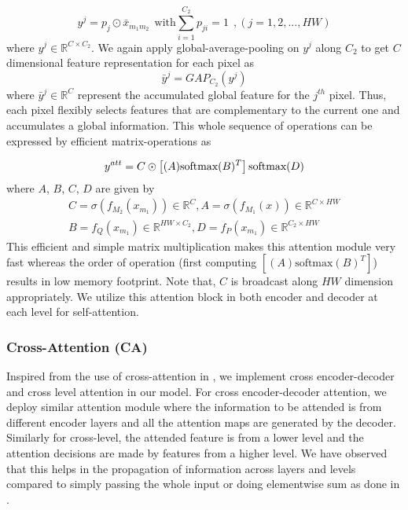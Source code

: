\documentclass[10pt,twocolumn,letterpaper]{article}
\begin{document}
\begin{equation}
y^j = p_j \odot \bar{x}_{{m_1}{m_2}} ~ ~ \text{with}  \sum_{i=1}^{C_2} p_{ji} = 1 ~ ~ , (j= 1,2,...,HW)
\end{equation}
where ${y}^j \in \mathbb{R}^{C \times C_2}$. We again apply global-average-pooling on ${y}^j$ along $C_2$ to get $C$ dimensional feature representation for each pixel as
\begin{equation}
    \bar{y}^{j} = GAP_{C_2}({y}^j)
\end{equation}
where $\bar{y}^{j} \in \mathbb{R}^C$ represent the accumulated global feature for the $j^{th}$ pixel. Thus, each pixel flexibly selects features that are complementary to the current one and accumulates a global information.
This whole sequence of operations can be expressed by efficient matrix-operations as



\begin{equation}
    y^{att} =  C\odot \left[(A)\text{softmax}(B)^T\right]\text{softmax}(D) \\ 
\end{equation} 
where $A$, $B$, $C$, $D$ are given by
\begin{gather*}
    C = \sigma (f_{M_2}(x_{m_1})) \in  \mathbb{R}^{C}  , A = \sigma(f_{M_1}(x)) \in  \mathbb{R}^{C \times HW} \\ 
    B = f_Q(x_{m_1}) \in  \mathbb{R}^{HW \times C_2}, D = f_P(x_{m_1}) \in  \mathbb{R}^{C_2 \times HW}
\end{gather*}
This efficient and simple matrix multiplication makes this attention module very fast whereas the order of operation (first computing $[(A)\text{softmax}(B)^T]$) results in low memory footprint. Note that, $C$ is broadcast along $HW$ dimension appropriately. We utilize this attention block in both encoder and decoder at each level for self-attention.
\subsubsection{Cross-Attention (CA)}
Inspired from the use of cross-attention in \cite{vaswani2017attention}, we implement cross encoder-decoder and cross level attention in our model. For cross encoder-decoder attention, we deploy similar attention module where the information to be attended is from different encoder layers and all the attention maps are generated by the decoder. Similarly for cross-level, the attended feature is from a lower level and the attention decisions are made by features from a higher level. We have observed that this helps in the propagation of information across layers and levels compared to simply passing the whole input or doing elementwise sum as done in \cite{zhang2019deep}. 
\end{document}
